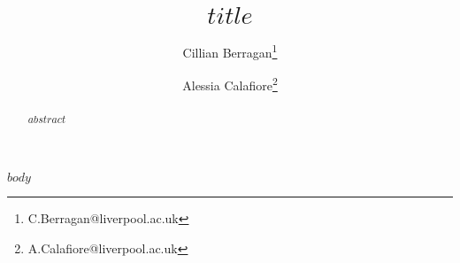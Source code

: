 \documentclass[11pt]{article}
\title{$title$}
\author[1]{Cillian Berragan\thanks{C.Berragan@liverpool.ac.uk}}
\author[1]{Alessia Calafiore\thanks{A.Calafiore@liverpool.ac.uk}}
\affil[1]{$institute$}
\begin{document}
\maketitle


\begin{abstract}
\centering

$abstract$

\end{abstract}


$body$




\end{document}
